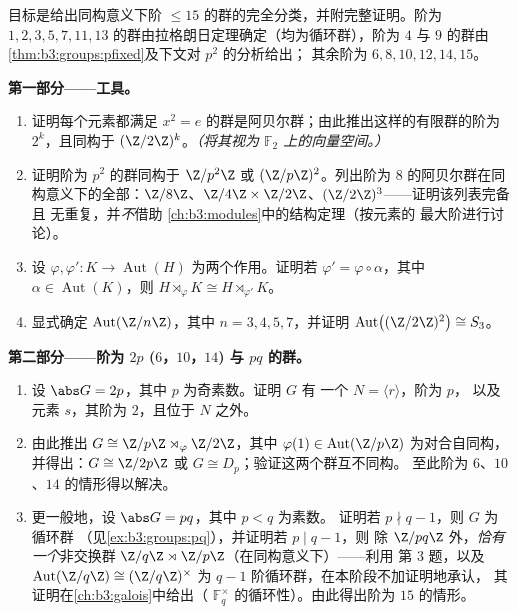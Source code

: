 \begin{problem}\label{pb:b3:groups:1}
目标是给出同构意义下阶
$\leq 15$ 的群的完全分类，并附完整证明。阶为 $1, 2, 3, 5,
7, 11, 13$ 的群由拉格朗日定理确定（均为循环群），阶为 $4$ 与
$9$ 的群由\cref{thm:b3:groups:pfixed}及下文对 $p^2$ 的分析给出；
其余阶为 $6, 8, 10, 12, 14, 15$。

\medskip
\noindent\textbf{第一部分——工具。}
\begin{enumerate}
  \item 证明每个元素都满足 $x^2 =
        e$ 的群是阿贝尔群；由此推出这样的有限群的阶为
        $2^k$，且同构于 $(\Z/2\Z)^k$。\emph{（将其视为
        $\mathbb F_2$ 上的向量空间。）}
  \item 证明阶为 $p^2$ 的群同构于
        $\Z/p^2\Z$ 或 $(\Z/p\Z)^2$。列出阶为
        $8$ 的阿贝尔群在同构意义下的全部：$\Z/8\Z$、$\Z/4\Z \times
        \Z/2\Z$、$(\Z/2\Z)^3$——证明该列表完备且
        无重复，并\emph{不}借助
        \cref{ch:b3:modules}中的结构定理（按元素的
        最大阶进行讨论）。
  \item 设 $\varphi, \varphi' \colon K \to \operatorname{Aut}(H)$
        为两个作用。证明若 $\varphi' = \varphi \circ
        \alpha$，其中 $\alpha \in \operatorname{Aut}(K)$，则 $H
        \rtimes_{\varphi} K \cong H \rtimes_{\varphi'} K$。
  \item 显式确定 $\operatorname{Aut}(\Z/n\Z)$，其中 $n = 3, 4, 5,
        7$，并证明 $\operatorname{Aut}\bigl((\Z/2\Z)^2
        \bigr) \cong S_3$。
\end{enumerate}

\medskip
\noindent\textbf{第二部分——阶为 $2p$ ($6$，$10$，$14$) 与
$pq$ 的群。}
\begin{enumerate}[resume]
  \item 设 $\abs G = 2p$，其中 $p$ 为奇素数。证明 $G$ 有
        一个 $N = \langle r \rangle$，阶为 $p$，
        以及元素 $s$，其阶为 $2$，且位于 $N$ 之外。
  \item 由此推出 $G \cong \Z/p\Z \rtimes_\varphi \Z/2\Z$，其中
        $\varphi(1) \in \operatorname{Aut}(\Z/p\Z)$ 为对合自同构，
        并得出：$G \cong \Z/2p\Z$ 或 $G \cong
        D_p$；验证这两个群互不同构。
        至此阶为 $6$、$10$、$14$ 的情形得以解决。
  \item 更一般地，设 $\abs G = pq$，其中 $p < q$ 为素数。
        证明若 $p \nmid q-1$，则 $G$ 为循环群
        （见\cref{ex:b3:groups:pq}），并证明若 $p \mid q - 1$，则
        除 $\Z/pq\Z$ 外，\emph{恰有一个}非交换群
        $\Z/q\Z \rtimes \Z/p\Z$（在同构意义下）——利用
        第 3 题，以及 $\operatorname{Aut}(\Z/q\Z) \cong
        (\Z/q\Z)^\times$ 为 $q - 1$ 阶循环群，在本阶段不加证明地承认，
        其证明在\cref{ch:b3:galois}中给出（
        $\mathbb F_q^\times$ 的循环性）。由此得出阶为 $15$ 的情形。
\end{enumerate}


\end{problem}
